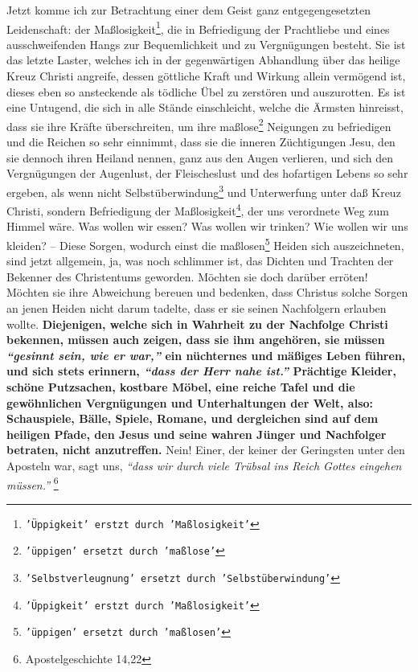 Jetzt komme ich zur Betrachtung einer dem Geist ganz entgegengesetzten
Leidenschaft: der Maßlosigkeit\footnote{\texttt{'Üppigkeit' erstzt durch 'Maßlosigkeit'}}, die in Befriedigung der Prachtliebe und eines
ausschweifenden Hangs zur Bequemlichkeit und zu Vergnügungen besteht. Sie ist
das letzte Laster, welches ich in der gegenwärtigen Abhandlung 
über das heilige
Kreuz Christi angreife, dessen göttliche Kraft und Wirkung allein vermögend ist,
dieses eben so ansteckende als tödliche Übel zu 
zerstören und auszurotten. Es
ist eine Untugend, die sich in alle Stände einschleicht, welche 
die Ärmsten
hinreisst, dass sie ihre Kräfte überschreiten, um ihre maßlose\footnote{\texttt{'üppigen' ersetzt durch 'maßlose'}} Neigungen zu
befriedigen und die Reichen so sehr einnimmt, dass sie die inneren Züchtigungen
Jesu, den sie dennoch ihren Heiland nennen, ganz aus den Augen verlieren, und sich
den Vergnügungen der Augenlust, der Fleischeslust und des 
hofartigen Lebens so
sehr ergeben, als wenn nicht Selbstüberwindung\footnote{\texttt{'Selbstverleugnung' ersetzt 
durch 'Selbstüberwindung'}}
 und Unterwerfung unter daß Kreuz
Christi, sondern Befriedigung der Maßlosigkeit\footnote{\texttt{'Üppigkeit' erstzt durch 'Maßlosigkeit'}},
der uns verordnete Weg zum Himmel
wäre. Was wollen wir essen? Was wollen wir trinken? Wie wollen wir uns kleiden?
-- Diese Sorgen, wodurch einst die maßlosen\footnote{\texttt{'üppigen' ersetzt durch 'maßlosen'}} 
Heiden sich auszeichneten, sind jetzt
allgemein, ja, was noch schlimmer ist, das Dichten und Trachten der Bekenner des
Christentums geworden. Möchten sie doch darüber erröten! Möchten sie ihre
Abweichung bereuen und bedenken, dass Christus solche Sorgen an jenen Heiden
nicht darum tadelte, dass er sie seinen Nachfolgern erlauben wollte.
\label{ref:14_01_wahre_nachfolger} \textbf{Diejenigen,
welche sich in Wahrheit zu der Nachfolge Christi bekennen, müssen auch zeigen,
dass sie ihm angehören, sie müssen
\textit{"`gesinnt sein, wie er war,"'} ein nüchternes
und mäßiges Leben führen, und sich stets erinnern,
\textit{"`dass der Herr nahe ist."'}
Prächtige Kleider, schöne Putzsachen, kostbare Möbel, 
eine reiche Tafel und die
gewöhnlichen Vergnügungen und Unterhaltungen der Welt, 
also: Schauspiele, Bälle,
Spiele, Romane, und dergleichen sind auf dem heiligen Pfade, 
den Jesus und seine wahren
Jünger und Nachfolger betraten, nicht anzutreffen.} Nein! Einer, der keiner der
Geringsten unter den Aposteln war, sagt uns,
\textit{"`dass wir durch viele Trübsal ins
Reich Gottes eingehen müssen."'}
\footnote{Apostelgeschichte 14,22}

